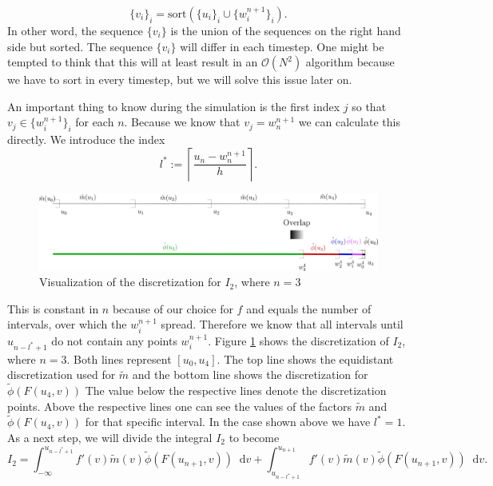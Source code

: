 \documentclass[12pt,a4paper,twoside, open=right]{scrreprt}
\theoremstyle{definition}
\theoremstyle{plain}
\newcommand{\D}{\mathop{}\!\mathrm{d}}
\begin{document}
\begin{equation}
    \{v_i\}_i=\text{sort}(\{u_i\}_i\cup \{w_i^{n+1}\}_i).
\end{equation}
In other word, the sequence $\{v_i\}$ is the union of the sequences on the right hand side but sorted. The sequence $\{v_i\}$ will differ in each timestep. One might be tempted to think that this will at least result in an $\mathcal{O}(N^2)$ algorithm because we have to sort in every timestep, but we will solve this issue later on.
\par An important thing to know during the simulation is the first index $j$ so that $v_j\in\{w_i^{n+1}\}_i$ for each $n$. Because we know that $v_j = w_{n}^{n+1}$ we can calculate this directly. We introduce the index
\begin{equation}
    l^*:=\left\lceil  \frac{u_n -w_{n}^{n+1}}{h}\right\rceil.
\end{equation}
\begin{figure}
    \centering
    \includegraphics[width=\textwidth]{Tranformls1}
    \caption{Visualization of the discretization for $I_2$, where $n=3$}
    \label{fig:vis1}
\end{figure}
This is constant in $n$ because of our choice for $f$ and equals the number of intervals, over which the $w_i^{n+1}$ spread. Therefore we know that all intervals until $u_{n-l^*+1}$ do not contain any points $w_i^{n+1}$.
 Figure \ref{fig:vis1} shows the discretization of $I_2$, where $n=3$. Both lines represent $[u_0,u_4]$. The top line shows the equidistant discretization used for $\tilde{m}$ and the bottom line shows the discretization for $\tilde\phi(F(u_{4},v))$ The value below the respective lines denote the discretization points. Above the respective lines one can see the values of the factors $\tilde{m}$ and $\tilde\phi(F(u_4,v))$ for that specific interval. In the case shown above we have $l^*=1$. As a next step, we will divide the integral $I_2$ to become
\begin{equation}
    I_2 = \int_{-\infty}^{u_{n-l^*+1}}f'(v)\tilde{m}(v)\tilde{\phi}(F(u_{n+1},v))\D v + \int_{u_{n-l^* +1}}^{u_{n+1}}f'(v)\tilde{m}(v)\tilde{\phi}(F(u_{n+1},v))\D v.
\end{equation}
\end{document}
